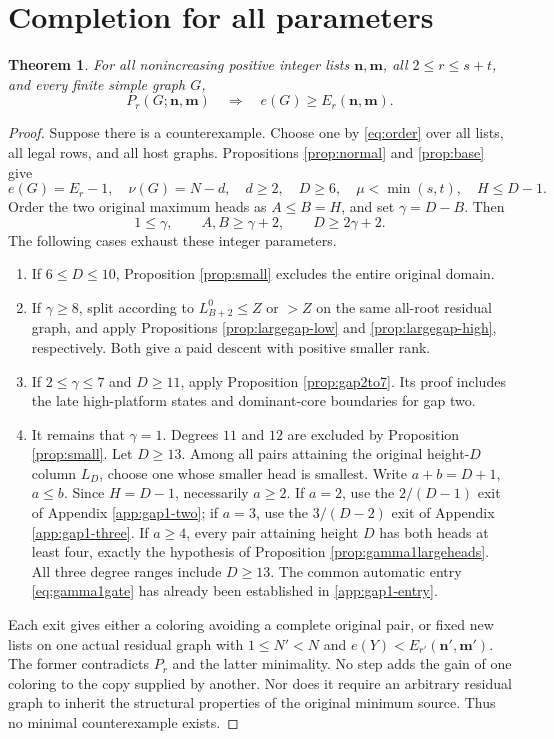 \documentclass[11pt,a4paper]{article}
\newcommand{\nn}{\mathbf n}\newcommand{\mm}{\mathbf m}
\newtheorem{theorem}{Theorem}[section]
\theoremstyle{definition}
\begin{document}
\section{Completion for all parameters}\label{sec:completion}
\begin{theorem}\label{thm:family}
For all nonincreasing positive integer lists $\nn,\mm$, all $2\le r\le s+t$, and every finite simple graph $G$,
\[
P_r(G;\nn,\mm)\quad\Longrightarrow\quad e(G)\ge E_r(\nn,\mm).
\]
\end{theorem}
\begin{proof}
Suppose there is a counterexample. Choose one by \eqref{eq:order} over all lists, all legal rows, and all host graphs. Propositions \ref{prop:normal} and \ref{prop:base} give
\[
e(G)=E_r-1,\quad \nu(G)=N-d,\quad d\ge2,\quad
D\ge6,\quad \mu<\min(s,t),\quad H\le D-1.
\]
Order the two original maximum heads as $A\le B=H$, and set $\gamma=D-B$. Then
\[
1\le\gamma,\qquad A,B\ge\gamma+2,\qquad D\ge2\gamma+2.
\]
The following cases exhaust these integer parameters.

\begin{enumerate}
\item If $6\le D\le10$, Proposition \ref{prop:small} excludes the entire original domain.
\item If $\gamma\ge8$, split according to $L_{B+2}^0\le Z$ or $>Z$ on the same all-root residual graph, and apply Propositions \ref{prop:largegap-low} and \ref{prop:largegap-high}, respectively. Both give a paid descent with positive smaller rank.
\item If $2\le\gamma\le7$ and $D\ge11$, apply Proposition \ref{prop:gap2to7}. Its proof includes the late high-platform states and dominant-core boundaries for gap two.
\item It remains that $\gamma=1$. Degrees $11$ and $12$ are excluded by Proposition \ref{prop:small}. Let $D\ge13$. Among all pairs attaining the original height-$D$ column $L_D$, choose one whose smaller head is smallest. Write $a+b=D+1$, $a\le b$. Since $H=D-1$, necessarily $a\ge2$. If $a=2$, use the $2/(D-1)$ exit of Appendix \ref{app:gap1-two}; if $a=3$, use the $3/(D-2)$ exit of Appendix \ref{app:gap1-three}. If $a\ge4$, every pair attaining height $D$ has both heads at least four, exactly the hypothesis of Proposition \ref{prop:gamma1largeheads}. All three degree ranges include $D\ge13$.
The common automatic entry \eqref{eq:gamma1gate} has already been established in \ref{app:gap1-entry}.
\end{enumerate}

Each exit gives either a coloring avoiding a complete original pair, or fixed new lists on one actual residual graph with $1\le N'<N$ and $e(Y)<E_{r'}(\nn',\mm')$. The former contradicts $P_r$ and the latter minimality. No step adds the gain of one coloring to the copy supplied by another. Nor does it require an arbitrary residual graph to inherit the structural properties of the original minimum source. Thus no minimal counterexample exists.
\end{proof}
\end{document}
